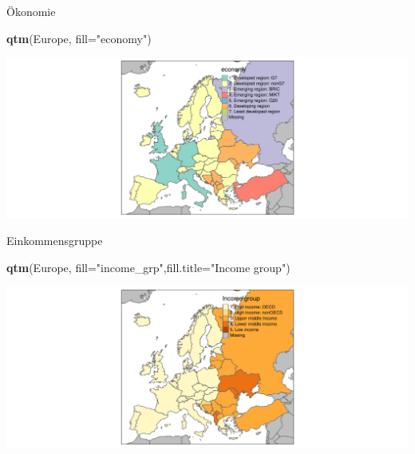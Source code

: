 \documentclass[ignorenonframetext,]{beamer}
\newenvironment{Shaded}{\begin{snugshade}}{\end{snugshade}}
\newcommand{\KeywordTok}[1]{\textcolor[rgb]{0.13,0.29,0.53}{\textbf{#1}}}
\newcommand{\DataTypeTok}[1]{\textcolor[rgb]{0.13,0.29,0.53}{#1}}
\newcommand{\StringTok}[1]{\textcolor[rgb]{0.31,0.60,0.02}{#1}}
\newcommand{\NormalTok}[1]{#1}
\begin{document}
\begin{frame}[fragile]{Ökonomie}

\begin{Shaded}
\begin{Highlighting}[]
\KeywordTok{qtm}\NormalTok{(Europe, }\DataTypeTok{fill=}\StringTok{"economy"}\NormalTok{) }
\end{Highlighting}
\end{Shaded}

\includegraphics{tmap_files/figure-beamer/unnamed-chunk-19-1.pdf}

\end{frame}

\begin{frame}[fragile]{Einkommensgruppe}

\begin{Shaded}
\begin{Highlighting}[]
\KeywordTok{qtm}\NormalTok{(Europe, }\DataTypeTok{fill=}\StringTok{"income_grp"}\NormalTok{,}\DataTypeTok{fill.title=}\StringTok{"Income group"}\NormalTok{) }
\end{Highlighting}
\end{Shaded}

\includegraphics{tmap_files/figure-beamer/unnamed-chunk-20-1.pdf}

\end{frame}
\end{document}

